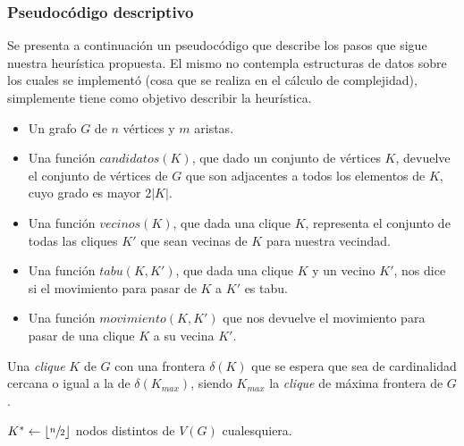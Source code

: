 \subsubsection{Pseudoc\'odigo descriptivo}
\par Se presenta a continuaci\'on un pseudoc\'odigo que describe los pasos que sigue
    nuestra heur\'istica propuesta. El mismo no contempla estructuras de datos sobre
    los cuales se implement\'o (cosa que se realiza en el c\'alculo de complejidad),
    simplemente tiene como objetivo describir la heur\'istica.

\bigskip

\begin{pseudocodigo}
    \Require\Statex
        \begin{itemize}
            \item Un grafo $G$ de $n$ v\'ertices y $m$ aristas.

            \item Una funci\'on $candidatos(K)$, que dado un conjunto de v\'ertices
                $K$, devuelve el conjunto de v\'ertices de $G$ que son adjacentes
                a todos los elementos de $K$, cuyo grado es mayor $2|K|$.

            \item Una funci\'on $vecinos(K)$, que dada una clique $K$, representa
                el conjunto de todas las cliques $K'$ que sean vecinas de $K$ para
                nuestra vecindad.

            \item Una funci\'on $tabu(K,K')$, que dada una clique $K$ y un vecino $K'$,
                nos dice si el movimiento para pasar de $K$ a $K'$ es tabu.

            \item Una funci\'on $movimiento(K,K')$ que nos devuelve el movimiento
                para pasar de una clique $K$ a su vecina $K'$.
        \end{itemize}
    \Statex
    \Ensure Una \emph{clique} $K$ de $G$ con una frontera $\delta(K)$ que se
        espera que sea de cardinalidad cercana o igual a la de $\delta(K_{max})$,
        siendo $K_{max}$ la \emph{clique} de m\'axima frontera de $G$.

    \Statex

        \State $K^* \gets \lfloor\sfrac{n}{2}\rfloor$ nodos distintos de $V(G)$ cualesquiera.
        \Statex


\end{pseudocodigo}
